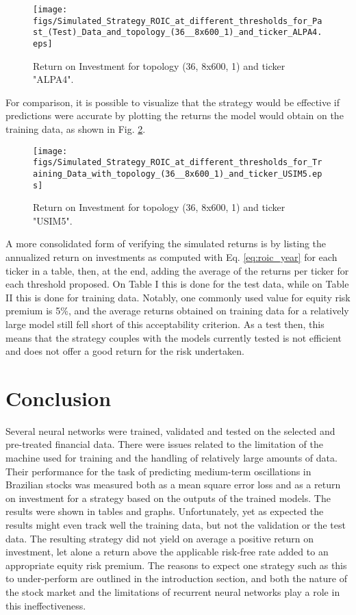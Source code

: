 \documentclass[conference]{IEEEtran}
\begin{document}
\begin{figure}[htbp]
	\centerline{\texttt{[image: figs/Simulated\_Strategy\_ROIC\_at\_different\_thresholds\_for\_Past\_(Test)\_Data\_and\_topology\_(36\_\_8x600\_1)\_and\_ticker\_ALPA4.eps]}}
	\caption{Return on Investment for topology (36, 8x600, 1) and ticker "ALPA4".}
	\label{fig:roic_bad}
\end{figure}

For comparison, it is possible to visualize that the strategy would be effective if predictions were accurate by plotting the returns the model would obtain on the training data, as shown in Fig. \ref{fig:roic_fake}.

\begin{figure}[htbp]
	\centerline{\texttt{[image: figs/Simulated\_Strategy\_ROIC\_at\_different\_thresholds\_for\_Training\_Data\_with\_topology\_(36\_\_8x600\_1)\_and\_ticker\_USIM5.eps]}}
	\caption{Return on Investment for topology (36, 8x600, 1) and ticker "USIM5".}
	\label{fig:roic_fake}
\end{figure}

A more consolidated form of verifying the simulated returns is by listing the annualized return on investments as computed with Eq. \ref{eq:roic_year} for each ticker in a table, then, at the end, adding the average of the returns per ticker for each threshold proposed. On Table I this is done for the test data, while on Table II this is done for training data. Notably, one commonly used value for equity risk premium is 5\%, and the average returns obtained on training data for a relatively large model still fell short of this acceptability criterion. As a test then, this means that the strategy couples with the models currently tested is not efficient and does not offer a good return for the risk undertaken.


\makereturnsini

\makereturnstrn


\section{Conclusion}
Several neural networks were trained, validated and tested on the selected and pre-treated financial data. There were issues related to the limitation of the machine used for training and the handling of relatively large amounts of data. Their performance for the task of predicting medium-term oscillations in Brazilian stocks was measured both as a mean square error loss and as a return on investment for a strategy based on the outputs of the trained models. The results were shown in tables and graphs. Unfortunately, yet as expected the results might even track well the training data, but not the validation or the test data. The resulting strategy did not yield on average a positive return on investment, let alone a return above the applicable risk-free rate added to an appropriate equity risk premium. The reasons to expect one strategy such as this to under-perform are outlined in the introduction section, and both the nature of the stock market and the limitations of recurrent neural networks play a role in this ineffectiveness. 
\end{document}
